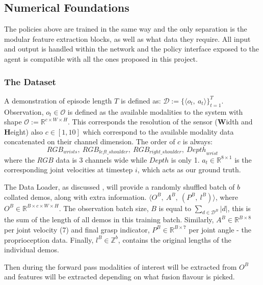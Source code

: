 \subsection{Numerical Foundations}

The policies above are trained in the same way and the only separation is the modular feature extraction blocks, as well as what data they require. All input and output is handled within the network and the policy interface exposed to the agent is compatible with all the ones proposed in this project.

\subsubsection{The Dataset}
A demonstration of episode length $T$ is defined as: \(\mathcal{D} := \{\langle o_t, ~a_t\rangle\}_{t = 1}^{T} \). Observation, \(o_t \in \mathcal{O}\) is defined as the available modalities to the system with shape \(\mathcal{O} := \mathbb{R}^{c \times W \times H}\). This corresponds the resolution of the sensor (\textbf{W}idth and \textbf{H}eight) also $c \in \left[1, 10\right]$ which correspond to the available modality data concatenated on their channel dimension. The order of $c$ is always:
\[
{RGB}_{wrists}, ~{RGB}_{{left}\_{shoulder}}, ~{RGB}_{{right}\_{shoulder}}, ~{Depth}_{wrist}
\] 
where the $RGB$ data is $3$ channels wide while $Depth$ is only 1. \(a_t \in \mathbb{R}^{8 \times 1}\) is the corresponding joint velocities at timestep $i$, which acts as our ground truth. 

The Data Loader, as discussed , will provide a randomly shuffled batch of $b$ collated demos, along with extra information. \( \langle O^B, ~A^B, ~\left( P^B, ~l^B \right) \rangle\), where \(O^B \in \mathbb{R}^{ B \times c \times W \times H}\). The observation batch size, $B$ is equal to \({\sum_{ d \in \mathcal{D}^B}|d|}\), this is the sum of the length of all demos in this training batch. Similarly, \(A^B \in \mathbb{R}^{B \times 8}\) per joint velocity (7) and final grasp indicator, \(P^B \in \mathbb{R}^{B \times 7}\) per joint angle - the proprioception data. Finally, \(l^B \in \mathbb{Z}^{b}\), contains the original lengths of the individual demos.

Then during the forward pass modalities of interest will be extracted from $O^B$ and features will be extracted depending on what fusion flavour is picked.



